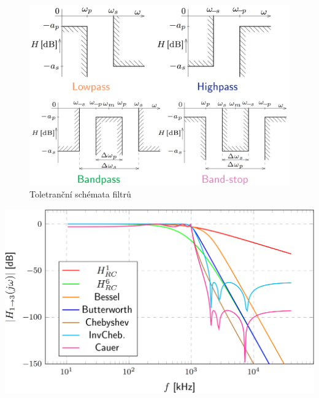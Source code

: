 \documentclass[a4paper,12pt]{article}   %
\begin{document}
\begin{figure}[H]
    \centering
    \includegraphics[width=.5\textwidth]{tolerancni_schema.PNG}
    \caption{Toletranční schémata filtrů}
    \label{fig:tolerancni:schemata}
\end{figure}
\begin{graf}[H]
    \centering
    \includegraphics[width=.8\textwidth]{modul-porovnani.PNG}
    \caption{Porovnání modulových charakteristik všech aproximací}
    \label{graf:modul:porovnani}
\end{graf}
\end{document}
